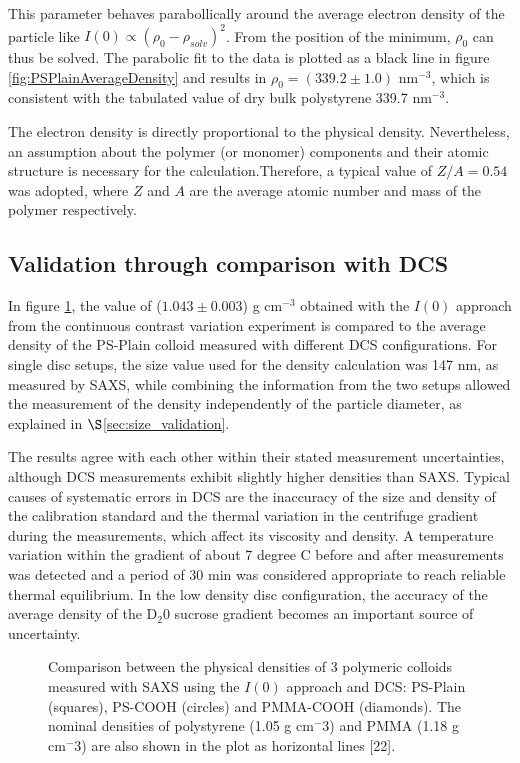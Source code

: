 This parameter behaves parabollically around the average electron density of the particle like $I(0)\propto \left( \rho_0 - \rho_{solv} \right)^2$\citep{avdeev_contrast_2007}. From the position of the minimum, $\rho_0$ can thus be solved. The parabolic fit to the data is plotted as a black line in figure \ref{fig:PSPlainAverageDensity} and results in $\rho_0=\left(339.2\pm1.0\right)$ nm$^{-3}$, which is consistent with the tabulated value of dry bulk polystyrene 339.7 nm$^{-3}$\citep{dingenouts_analysis_1999}.

The electron density is directly proportional to the physical density. Nevertheless, an assumption about the polymer (or monomer) components and their atomic structure is necessary for the calculation.Therefore, a typical value of $Z/A=0.54$ was adopted, where $Z$ and $A$ are the average atomic number and mass of the polymer respectively.

\subsection{Validation through comparison with DCS}

In figure \ref{fig:DensityComparison}, the value of ($1.043\pm0.003$) g cm$^{-3}$ obtained with the $I(0)$ approach from the continuous contrast variation experiment is compared to the average density of the PS-Plain colloid measured with different DCS configurations. For single disc setups, the size value used for the density calculation was 147 nm, as measured by SAXS, while combining the information from the two setups allowed the measurement of the density independently of the particle diameter, as explained in $\S$\ref{sec:size_validation}.

The results agree with each other within their stated measurement uncertainties, although DCS measurements exhibit slightly higher densities than SAXS. Typical causes of systematic errors in DCS are the inaccuracy of the size and density of the calibration standard and the thermal variation in the centrifuge gradient during the measurements, which affect its viscosity and density\citep{kamiti_simultaneous_2012}. A temperature variation within the gradient of about 7 degree C before and after measurements was detected and a period of 30 min was considered appropriate to reach reliable thermal equilibrium. In the low density disc configuration, the accuracy of the average density of the D$_2$0 sucrose gradient becomes an important source of uncertainty.
\begin{figure}
	\begin{center}
		
	\end{center}
	\caption{Comparison between the physical densities of 3 polymeric colloids measured with SAXS using the $I(0)$ approach and DCS: PS-Plain (squares), PS-COOH (circles) and PMMA-COOH (diamonds). The nominal densities of polystyrene (1.05 g cm$^-3$) and PMMA (1.18 g cm$^-3$) are also shown in the plot as horizontal lines [22].}
	\label{fig:DensityComparison}
\end{figure}
